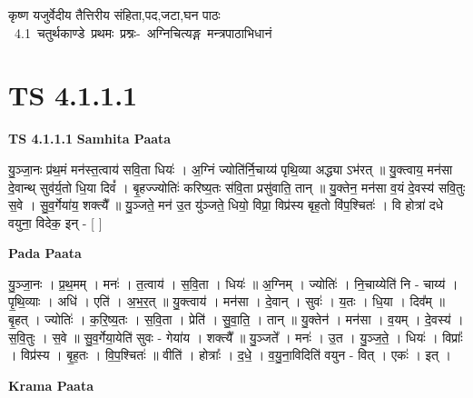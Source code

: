 \documentclass[17pt]{extarticle}
\begin{document}
\begin{titlepage}
    \begin{center}
 
\begin{sanskrit}
    { \Large
    कृष्ण यजुर्वेदीय तैत्तिरीय संहिता,पद,जटा,घन पाठः 
    }
    \\
    \vspace{2.5cm}
    \mbox{ \Large
    4.1     चतुर्थकाण्डे प्रथमः प्रश्नः- अग्निचित्यङ्ग मन्त्रपाठाभिधानं   }
\end{sanskrit}
\end{center}

\end{titlepage}
\tableofcontents
{}
\pagebreak


\section{ TS 4.1.1.1 }

\textbf{TS 4.1.1.1 } \newline
\textbf{Samhita Paata} \newline

यु॒ञ्जा॒नः प्र॑थ॒मं मन॑स्त॒त्वाय॑ सवि॒ता धियः॑ । अ॒ग्निं ज्योति॑र्नि॒चाय्य॑ पृथि॒व्या अद्ध्या ऽभ॑रत् ॥ यु॒क्त्वाय॒ मन॑सा दे॒वान्थ् सुव॑र्य॒तो धि॒या दिवं᳚ । बृ॒हज्ज्योतिः॑ करिष्य॒तः स॑वि॒ता प्रसु॑वाति॒ तान् ॥ यु॒क्तेन॒ मन॑सा व॒यं दे॒वस्य॑ सवि॒तुः स॒वे । सु॒व॒र्गेया॑य॒ शक्त्यै᳚ ॥ यु॒ञ्जते॒ मन॑ उ॒त यु॑ञ्जते॒ धियो॒ विप्रा॒ विप्र॑स्य बृह॒तो वि॑प॒श्चितः॑ । वि होत्रा॑ दधे वयुना॒ विदेक॒ इन् - [  ] \newline

\textbf{Pada Paata} \newline

यु॒ञ्जा॒नः । प्र॒थ॒मम् । मनः॑ । त॒त्वाय॑ । स॒वि॒ता । धियः॑ ॥ अ॒ग्निम् । ज्योतिः॑ । नि॒चाय्येति॑ नि - चाय्य॑ । पृ॒थि॒व्याः । अधि॑ । एति॑ । अ॒भ॒र॒त् ॥ यु॒क्त्वाय॑ । मन॑सा । दे॒वान् । सुवः॑ । य॒तः । धि॒या । दिव᳚म् ॥ बृ॒हत् । ज्योतिः॑ । क॒रि॒ष्य॒तः । स॒वि॒ता । प्रेति॑ । सु॒वा॒ति॒ । तान् ॥ यु॒क्तेन॑ । मन॑सा । व॒यम् । दे॒वस्य॑ । स॒वि॒तुः । स॒वे ॥ सु॒व॒र्गेया॒येति॑ सुवः - गेया॑य । शक्त्यै᳚ ॥ यु॒ञ्जते᳚ । मनः॑ । उ॒त । यु॒ञ्ज॒ते॒ । धियः॑ । विप्राः᳚ । विप्र॑स्य । बृ॒ह॒तः । वि॒प॒श्चितः॑ ॥ वीति॑ । होत्राः᳚ । द॒धे॒ । व॒यु॒ना॒विदिति॑ वयुन - वित् । एकः॑ । इत् ।  \newline


\textbf{Krama Paata} \newline
\end{document}

